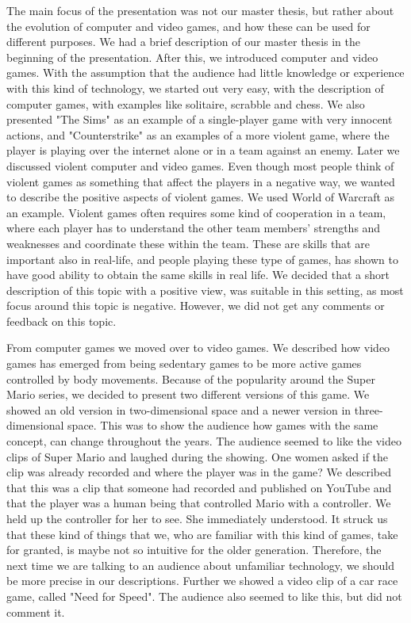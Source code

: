 The main focus of the presentation was not our master thesis, but rather about the evolution of computer and video games, and how these can be used for different purposes. We had a brief description of our master thesis in the beginning of the presentation. After this, we introduced computer and video games. With the assumption that the audience had little knowledge or experience with this kind of technology, we started out very easy, with the description of computer games, with examples like solitaire, scrabble and chess. We also presented "The Sims" as an example of a single-player game with very innocent actions, and "Counterstrike" as an examples of a more violent game, where the player is playing over the internet alone or in a team against an enemy. Later we discussed violent computer and video games. Even though most people think of violent games as something that affect the players in a negative way, we wanted to describe the positive aspects of violent games. We used World of Warcraft as an example. Violent games often requires some kind of cooperation in a team, where each player has to understand the other team members' strengths and weaknesses and coordinate these within the team. These are skills that are important also in real-life, and people playing these type of games, has shown to have good ability to obtain the same skills in real life. We decided that a short description of this topic with a positive view, was suitable in this setting, as most focus around this topic is negative. However, we did not get any comments or feedback on this topic. 

From computer games we moved over to video games. We described how video games has emerged from being sedentary games to be more active games controlled by body movements. Because of the popularity around the Super Mario series, we decided to present two different versions of this game. We showed an old version in two-dimensional space and a newer version in three-dimensional space. This was to show the audience how games with the same concept, can change throughout the years. The audience seemed to like the video clips of Super Mario and laughed during the showing. One women asked if the clip was already recorded and where the player was in the game? We described that this was a clip that someone had recorded and published on YouTube and that the player was a human being that controlled Mario with a controller. We held up the controller for her to see. She immediately understood. It struck us that these kind of things that we, who are familiar with this kind of games, take for granted, is maybe not so intuitive for the older generation. Therefore, the next time we are talking to an audience about unfamiliar technology, we should be more precise in our descriptions. Further we showed a video clip of a car race game, called "Need for Speed". The audience also seemed to like this, but did not comment it. 

